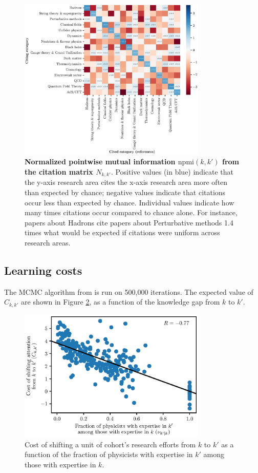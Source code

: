 \documentclass{article}
\begin{document}
\begin{figure}[H]
    \centering
    \includegraphics[width=0.8\textwidth]{plots/topic_citation_matrix.eps}
    \caption{\textbf{Normalized pointwise mutual information $\mathrm{npmi}(k,k')$ from the citation matrix $N_{k,k'}$}. Positive values (in blue) indicate that the y-axis research area cites the x-axis research area more often than expected by chance; negative values indicate that citations occur less than expected by chance. Individual values indicate how many times citations occur compared to chance alone. For instance, papers about Hadrons cite papers about Perturbative methods 1.4 times what would be expected if citations were uniform across research areas.}
    \label{fig:topic_citation_matrix}
\end{figure}

\subsection{Learning costs}

The MCMC algorithm from \citet{Chu2021} is run on 500,000 iterations. The expected value of $C_{k,k'}$ are shown in Figure \ref{fig:cost_knowledge}, as a function of the knowledge gap from $k$ to $k'$.

\begin{figure}[H]
    \centering
    \includegraphics[width=0.8\textwidth]{plots/cost_vs_nu_knowledge.eps}
    \caption{Cost of shifting a unit of cohort's research efforts from $k$ to $k'$ as a function of the fraction of physicists with expertise in $k'$ among those with expertise in $k$.}
    \label{fig:cost_knowledge}
\end{figure}
\end{document}
